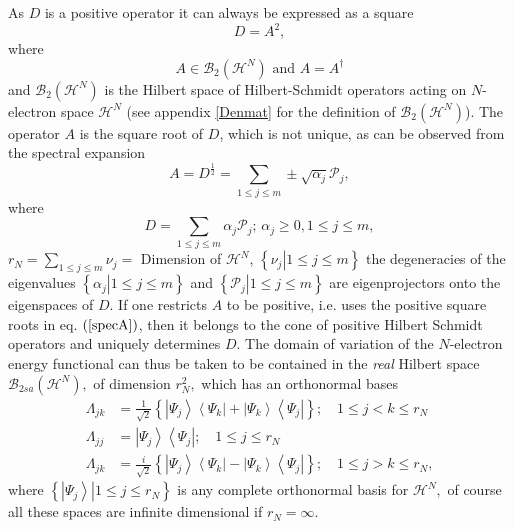 \documentclass[aps,preprint]{revtex4}%
\begin{document}
As $D$ is a positive operator it can always be expressed as a square
\begin{equation}
D=A^{2},
\end{equation}
where
\begin{equation}
A\in\mathcal{B}_{2}\left(  \mathcal{H}^{N}\right)  \text{ and }A=A^{\dagger}%
\end{equation}
and $\mathcal{B}_{2}\left(  \mathcal{H}^{N}\right)  $ is the Hilbert space of
Hilbert-Schmidt operators acting on $N$-electron space $\mathcal{H}^{N}$ (see
appendix \ref{Denmat} for the definition of $\mathcal{B}_{2}\left(
\mathcal{H}^{N}\right)  $). The operator $A$ is the square root of $D$, which
is not unique, as can be observed from the spectral expansion
\begin{equation}
A=D^{\frac{1}{2}}=\sum_{1\leq j\leq m}\pm\sqrt{\alpha_{j}}\mathcal{P}_{j},
\label{specA}%
\end{equation}
where
\begin{equation}
D=\sum_{1\leq j\leq m}\alpha_{j}\mathcal{P}_{j};\,\alpha_{j}\geq0,1\leq j\leq
m,
\end{equation}
$r_{N}=\sum\limits_{1\leq j\leq m}\nu_{j}=$ Dimension of $\mathcal{H}^{N}$,
$\left\{  \left.  \nu_{j}\right\vert 1\leq j\leq m\right\}  $ the degeneracies
of the eigenvalues $\left\{  \left.  \alpha_{j}\right\vert 1\leq j\leq
m\right\}  $ and $\left\{  \left.  \mathcal{P}_{j}\right\vert 1\leq j\leq
m\right\}  $ are eigenprojectors onto the eigenspaces of $D$. If one restricts
$A$ to be positive, i.e. uses the positive square roots in eq. $\left(
\ref{specA}\right)  $, then it belongs to the cone \cite{Encyclo} of positive
Hilbert Schmidt operators and uniquely determines $D$. The domain of variation
of the $N$-electron energy functional can thus be taken to be contained in the
\emph{real} Hilbert space $\mathcal{B}_{2sa}\left(  \mathcal{H}^{N}\right)  ,$
of dimension $r_{N}^{2},$ which has an orthonormal bases
\begin{align}
\Lambda_{jk}  &  =\frac{1}{\sqrt{2}}\left\{  \left\vert \Psi_{j}\right\rangle
\left\langle \Psi_{k}\right\vert +\left\vert \Psi_{k}\right\rangle
\left\langle \Psi_{j}\right\vert \right\}  ;\quad1\leq j<k\leq r_{N}%
\nonumber\\
\Lambda_{jj}  &  =\left\vert \Psi_{j}\right\rangle \left\langle \Psi
_{j}\right\vert ;\quad1\leq j\leq r_{N}\nonumber\\
\Lambda_{jk}  &  =\frac{i}{\sqrt{2}}\left\{  \left\vert \Psi_{j}\right\rangle
\left\langle \Psi_{k}\right\vert -\left\vert \Psi_{k}\right\rangle
\left\langle \Psi_{j}\right\vert \right\}  ;\quad1\leq j>k\leq r_{N},
\end{align}
where $\left\{  \left.  \left\vert \Psi_{j}\right\rangle \right\vert 1\leq
j\leq r_{N}\right\}  $ is any complete orthonormal basis for $\mathcal{H}%
^{N},$ of course all these spaces are infinite dimensional if $r_{N}=\infty.$
\end{document}
